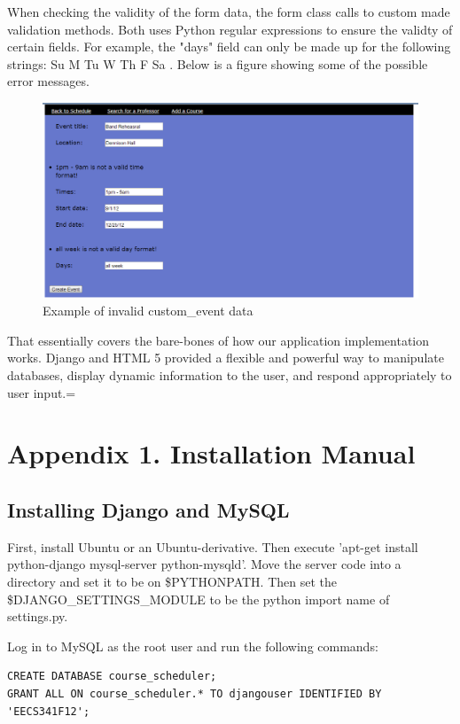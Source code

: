 \documentclass[pdftex,12pt,letter]{article}
\begin{document}
When checking the validity of the form data, the form class calls to custom made validation methods. Both uses Python regular expressions to ensure the validty of certain fields. For example, the "days" field can only be made up for the following strings: Su M Tu W Th F Sa . Below is a figure showing some of the possible error messages.
\begin{figure}
\includegraphics[width=6in]{eventErr.png}
\caption{Example of invalid custom\_event data}
\end{figure}
\FloatBarrier

That essentially covers the bare-bones of how our application implementation works. Django and HTML 5 provided a flexible and powerful way to manipulate databases, display dynamic information to the user, and respond appropriately to user input.=

%
\newpage
\appendix
\section{Appendix 1. Installation Manual}
\subsection{Installing Django and MySQL}
First, install Ubuntu or an Ubuntu-derivative.  Then execute 'apt-get install python-django mysql-server python-mysqld'.  Move the server code into a directory and set it to be on \$PYTHONPATH.  Then set the \$DJANGO\_SETTINGS\_MODULE to be the python import name of settings.py.

Log in to MySQL as the root user and run the following commands:

\begin{verbatim}
CREATE DATABASE course_scheduler;
GRANT ALL ON course_scheduler.* TO djangouser IDENTIFIED BY 'EECS341F12';
\end{verbatim}
\end{document}
